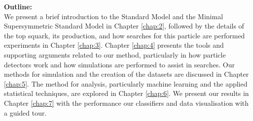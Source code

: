 \newpage
\noindent\textbf{Outline:}\\
We present a brief introduction to the Standard Model and the Minimal Supersymmetric Standard Model in Chapter \ref{chap:2}, followed by the details of the top squark, its production, and how searches for this particle are performed experiments in Chapter \ref{chap:3}. Chapter \ref{chap:4} presents the tools and supporting arguments related to our method, particularly in how particle detectors work and how simulations are performed to assist in searches. Our methods for simulation and the creation of the datasets are discussed in Chapter \ref{chap:5}. The method for analysis, particularly machine learning and the applied statistical techniques, are explored in Chapter \ref{chap:6}. We present our results in Chapter \ref{chap:7} with the performance our classifiers and data visualisation with a guided tour.